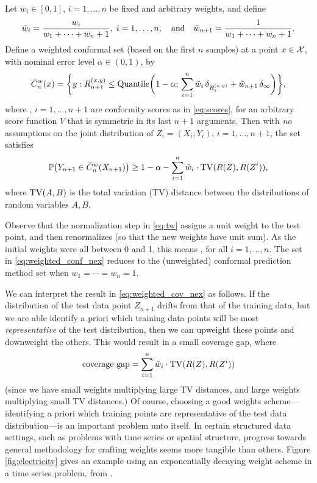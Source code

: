 \documentclass{article}
\begin{document}
\begin{theorem}
\label{thm:weighted_conf_nex}
Let $w_i \in [0,1]$, $i=1,\dots,n$ be fixed and arbitrary weights, and define 
\begin{equation}
\label{eq:tw}
\tilde{w}_i = \frac{w_i}{w_1 + \cdots + w_n + 1}, \; i=1,\ldots,n, 
\quad \text{and} \quad 
\tilde{w}_{n+1} = \frac{1}{w_1 + \cdots + w_n + 1}.
\end{equation}
Define a weighted conformal set (based on the first $n$ samples) at a point
$x \in \mathcal{X}$, with nominal error level $\alpha \in (0,1)$, by   
\begin{equation}
\label{eq:weighted_conf_nex}
\hat{C}^w_n(x) = \bigg\{ y : R_{n+1}^{(x,y)} \leq \mathrm{Quantile}\bigg( 1-\alpha; 
\, \sum_{i=1}^n \tilde{w}_i \, \delta_{R_i^{(x,y)}} + \tilde{w}_{n+1} \, \delta_\infty
\bigg) \bigg\},   
\end{equation}
where , $i=1,\ldots,n+1$ are conformity scores as in
\eqref{eq:scores}, for an arbitrary score function $V$ that is symmetric in its
last $n+1$ arguments. Then with \emph{no} assumptions on the joint distribution
of $Z_i=(X_i,Y_i)$, $i=1,\dots,n+1$, the set  satisfies
\begin{equation}
\label{eq:weighted_cov_nex}
\mathbb{P}\big( Y_{n+1} \in \hat{C}^w_n(X_{n+1}) \big) \geq 1-\alpha - \sum_{i=1}^n 
\tilde{w}_i \cdot \mathrm{TV}(R(Z), R(Z^i)),
\end{equation}
where $\mathrm{TV}(A,B)$ is the total variation (TV) distance between the distributions
of random variables $A,B$.  
\end{theorem}

Observe that the normalization step in \eqref{eq:tw} assigns a unit weight to 
the test point, and then renormalizes (so that the new weights have unit
sum). As the initial weights were all between 0 and 1, this means
, for all $i=1,\dots,n$. The set in
\eqref{eq:weighted_conf_nex} reduces to the (unweighted) conformal prediction
method set when $w_1 = \cdots = w_n = 1$.  

We can interpret the result in \eqref{eq:weighted_cov_nex} as follows. If the
distribution of the test data point $Z_{n+1}$ drifts from that of the training
data, but we are able identify a priori which training data points will be most
\emph{representative} of the test distribution, then we can upweight these
points and downweight the others. This would result in a small coverage gap, 
where  
\begin{equation}
\label{eq:coverage_gap}
\text{coverage gap} = \sum_{i=1}^n \tilde{w}_i \cdot \mathrm{TV}(R(Z), R(Z^i))
\end{equation}
(since we have small weights multiplying large TV distances, and large weights 
multiplying small TV distances.) Of course, choosing a good weights
scheme---identifying a priori which training points are representative of the
test data distribution---is an important problem unto itself. In certain
structured data settings, such as problems with time series or spatial
structure, progress towards general methodology for crafting weights seems more
tangible than others. Figure \ref{fig:electricity} gives an example using an
exponentially decaying weight scheme in a time series problem, from
\citet{barber2023conformal}.  
\end{document}
